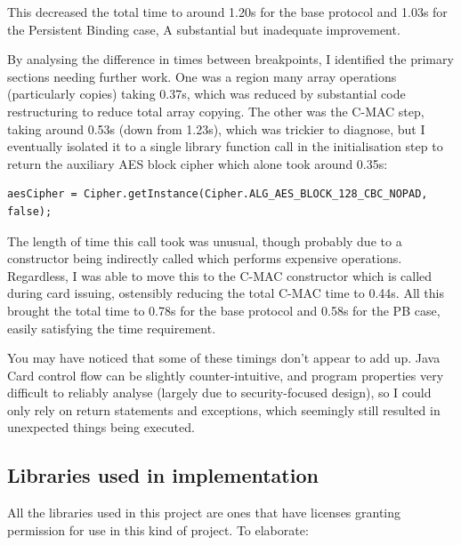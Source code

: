 \documentclass[12pt,a4paper]{article}
\begin{document}
This decreased the total time to around 1.20s for the base protocol and 1.03s for the Persistent Binding case, A substantial but inadequate improvement. 

By analysing the difference in times between breakpoints, I identified the primary sections needing further work. One was a region many array operations (particularly copies) taking 0.37s, which was reduced by substantial code restructuring to reduce total array copying. The other was the C-MAC step, taking around 0.53s (down from 1.23s), which was trickier to diagnose, but I eventually isolated it to a single library function call in the initialisation step to return the auxiliary AES block cipher which alone took around 0.35s:
\begin{verbatim}
aesCipher = Cipher.getInstance(Cipher.ALG_AES_BLOCK_128_CBC_NOPAD, false);
\end{verbatim}
The length of time this call took was unusual, though probably due to a constructor being indirectly called which performs expensive operations. Regardless, I was able to move this to the C-MAC constructor which is called during card issuing, ostensibly reducing the total C-MAC time to 0.44s. All this brought the total time to 0.78s for the base protocol and 0.58s for the PB case, easily satisfying the time requirement.

You may have noticed that some of these timings don't appear to add up. Java Card control flow can be slightly counter-intuitive, and program properties very difficult to reliably analyse (largely due to security-focused design), so I could only rely on return statements and exceptions, which seemingly still resulted in unexpected things being executed.

\subsection{Libraries used in implementation}
\label{subsec:libraries}
All the libraries used in this project are ones that have licenses granting permission for use in this kind of project. To elaborate:
\end{document}
